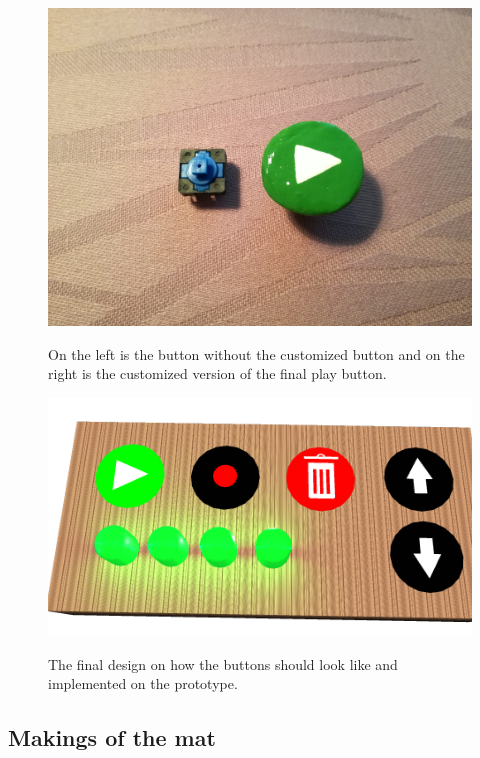 \begin{figure}[H]
	\centering
	\includegraphics[width=0.7\linewidth]{figure/Design/buttons}
	\label{fig:buttons}
	\caption{On the left is the button without the customized button and on the right is the customized version of the final play button.}
	
\end{figure}

\begin{figure}[H]
	\centering
	\includegraphics[width=0.7\linewidth]{figure/Design/buttonDesign}
	\label{fig:buttonDesign}
	\caption{The final design on how the buttons should look like and implemented on the prototype.}
	
\end{figure}


\subsection{Makings of the mat}

